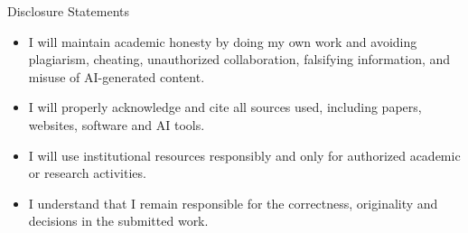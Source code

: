 \begin{frame}{Disclosure Statements}
\begin{itemize}
\item I will maintain academic honesty by doing my own work and avoiding plagiarism, cheating, unauthorized collaboration, falsifying information, and misuse of AI-generated content.
\item I will properly acknowledge and cite all sources used, including papers, websites, software and AI tools.
\item I will use institutional resources responsibly and only for authorized academic or research activities.
\item I understand that I remain responsible for the correctness, originality and decisions in the submitted work.
\end{itemize}
\end{frame}
